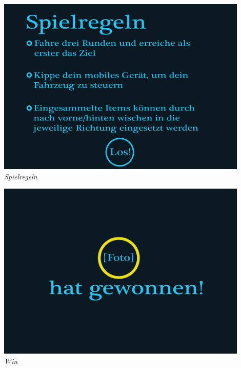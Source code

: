 \begin{flushright}
\includegraphics[width=0.9\textwidth]{img/spielregeln.png}\\
\textit{Spielregeln}

\includegraphics[width=0.9\textwidth]{img/win.png}\\
\textit{Win}\\[3em]

\end{flushright}
